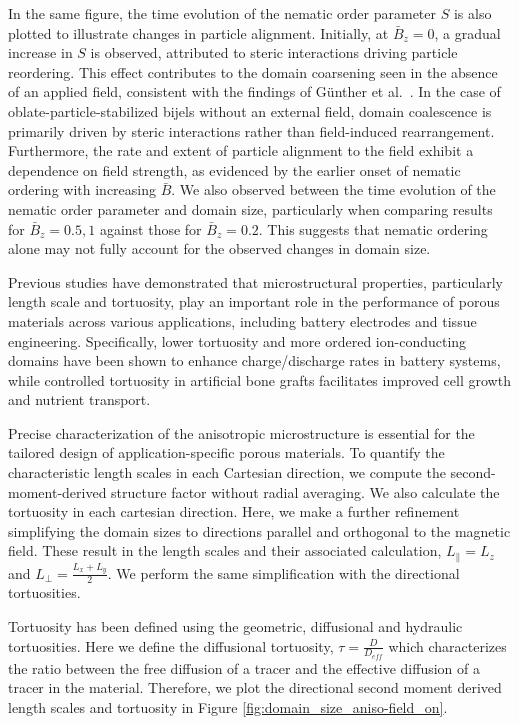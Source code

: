 In the same figure, the time evolution of the nematic order parameter
\(S\) is also plotted to illustrate changes in particle alignment.
Initially, at \(\bar{B}_z = 0\), a gradual increase in \(S\) is
observed, attributed to steric interactions driving particle reordering.
This effect contributes to the domain coarsening seen in the absence of
an applied field, consistent with the findings of Günther et
al.~\cite{gunther_timescales_2014}. In the case of
oblate-particle-stabilized bijels without an external field, domain
coalescence is primarily driven by steric interactions rather than
field-induced rearrangement. Furthermore, the rate and extent of
particle alignment to the field exhibit a dependence on field strength,
as evidenced by the earlier onset of nematic ordering with increasing
\(\bar{B}\). We also observed between the time evolution of the nematic
order parameter and domain size, particularly when comparing results for
\(\bar{B}_z = 0.5, 1\) against those for \(\bar{B}_z = 0.2\). This
suggests that nematic ordering alone may not fully account for the
observed changes in domain size.

Previous studies have demonstrated that microstructural properties,
particularly length scale and tortuosity, play an important role in the
performance of porous materials across various applications, including
battery electrodes and tissue engineering. \cite{zhang_promoting_2019}
\cite{ebner_tortuosity_2014} \cite{hsieh_architected_2021} Specifically,
lower tortuosity and more ordered ion-conducting domains have been shown
to enhance charge/discharge rates in battery systems, while controlled
tortuosity in artificial bone grafts facilitates improved cell growth
and nutrient transport.

Precise characterization of the anisotropic microstructure is essential
for the tailored design of application-specific porous materials. To
quantify the characteristic length scales in each Cartesian direction,
we compute the second-moment-derived structure factor without radial
averaging. \cite{jansen_bijels_2011} We also calculate the tortuosity 
in each cartesian direction. Here, we make a further
refinement simplifying the domain sizes to directions parallel and
orthogonal to the magnetic field. These result in the length scales and
their associated calculation, \(L_{\parallel} = L_{z}\) and
\(L_{\perp} = \frac{L_x + L_y}{2}\). We perform the same simplification
with the directional tortuosities.

Tortuosity has been defined using
the geometric, diffusional and hydraulic tortuosities. Here we define
the diffusional tortuosity, \(\tau = \frac{D}{D_{eff}}\) which
characterizes the ratio between the free diffusion of a tracer and the
effective diffusion of a tracer in the material. Therefore, we plot
the directional second moment derived length scales and tortuosity in
Figure \ref{fig:domain_size_aniso-field_on}.


